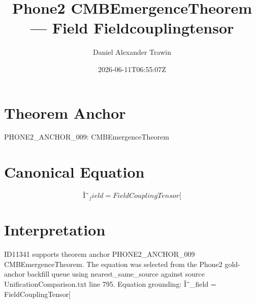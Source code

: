 \documentclass[11pt]{article}
\title{Phone2 CMBEmergenceTheorem — Field Fieldcouplingtensor}
\author{Daniel Alexander Trawin}
\date{2026-06-11T06:55:07Z}
\begin{document}
\maketitle
\section*{Theorem Anchor}
PHONE2_ANCHOR_009: CMBEmergenceTheorem
\section*{Canonical Equation}
\[
Î˜_field = FieldCouplingTensor[
\]
\section*{Interpretation}
ID11341 supports theorem anchor PHONE2_ANCHOR_009 CMBEmergenceTheorem. The equation was selected from the Phone2 gold-anchor backfill queue using nearest_same_source against source UnificationComparison.txt line 795. Equation grounding: Î˜_field = FieldCouplingTensor[
\end{document}
